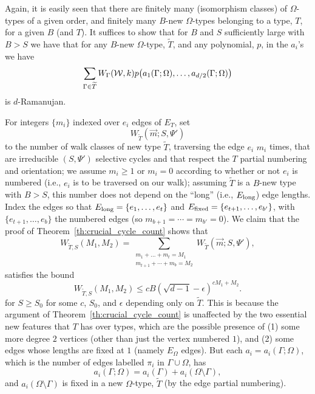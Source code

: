 \documentclass[12pt]{article}
\newcommand{\dtreelike}{{$d$-Ramanujan}}
\newcommand{\El}{{E_{\rm long}}}
\newcommand{\Ef}{{E_{\rm fixed}}}
\newcommand{\cw}{{\cal W}}
\newcommand{\tset}{{\Psi}}
\begin{document}
Again, it is easily seen that there are finitely many (isomorphism
classes) of $\Omega$-types of a given order, and finitely many
$B$-new $\Omega$-types belonging to a type, $T$,
for a given $B$ (and $T$).  It suffices to show that for $B$ and $S$
sufficiently large with $B>S$ we have that for any $B$-new $\Omega$-type,
$\widetilde T$, and any polynomial, $p$, in the $a_i$'s we have
$$
\sum_{\Gamma\in \widetilde T}  W_\Gamma(\cw,k)  %
p\bigl( a_1(\Gamma;\Omega),\ldots,a_{d/2}(\Gamma;\Omega) \bigr)
$$
is {\dtreelike}.

For integers $\{m_i\}$ indexed over $e_i$ edges of $E_T$,
set
$$
W_{\widetilde T}(\vec m;S,\tset')
$$
to the number of walk classes of new type $\widetilde T$,
traversing the edge $e_i$ $m_i$ times, that are
irreducible $(S,\tset')$ selective cycles and that respect the
$T$ partial numbering and orientation; we assume $m_i\ge 1$ or $m_i=0$
according to whether or not $e_i$ is numbered (i.e., $e_i$ is to be
traversed on our walk); assuming $\widetilde T$
is a $B$-new type with $B>S$, this number does not depend on the
``long'' (i.e., $\El$) edge lengths.
Index the edges so that $\El=\{e_1,\ldots,e_t\}$
and $\Ef=\{e_{t+1},\ldots,e_{b'}\}$, with $\{e_{t+1},\ldots,e_b\}$ the
numbered edges (so $m_{b+1}=\cdots=m_{b'}=0$).
We claim that the proof of Theorem~\ref{th:crucial_cycle_count} shows that
$$
W_{\widetilde T,S}(M_1,M_2) =
\sum_{\substack{ m_1+\ldots+m_t=M_1\\
\scriptstyle m_{t+1}+\cdots+m_b=M_2} }
W_{\widetilde T}(\vec m;S,\tset'),
$$
satisfies the bound
$$
W_{\widetilde T,S}(M_1,M_2) \le c B (\sqrt{d-1}-\epsilon)^{cM_1+M_2}.
$$
for $S\ge S_0$
for some $c$, $S_0$, and $\epsilon$ depending only on $\widetilde T$.
This is because the argument of Theorem~\ref{th:crucial_cycle_count}
is unaffected by the two essential new features that
$T$ has over types, which are the possible presence of
(1) some more degree $2$ vertices (other than just the vertex numbered
$1$), and (2) some edges whose lengths are
fixed at $1$ (namely $E_\Omega$ edges).
But each $a_i=a_i(\Gamma;\Omega)$,
which is the number of edges labelled $\pi_i$ in $\Gamma\cup\Omega$, has
$$
a_i(\Gamma;\Omega)=a_i(\Gamma)+a_i(\Omega\setminus\Gamma),
$$
and $a_i(\Omega\setminus\Gamma)$ is fixed in
a new $\Omega$-type, $\widetilde T$ (by the edge partial numbering).  
\end{document}
